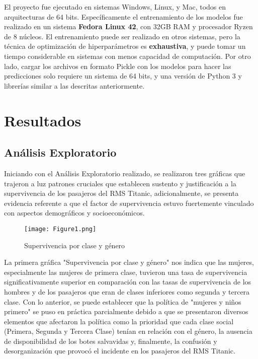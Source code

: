 \documentclass[conference]{IEEEtran}
\begin{document}
El proyecto fue ejecutado en sistemas Windows, Linux, y Mac, todos en arquitecturas de 64
bits. Específicamente el entrenamiento de los modelos fue realizado en un sistema \textbf{Fedora
Linux 42}, con 32GB RAM y procesador Ryzen de 8 núcleos. El entrenamiento puede ser
realizado en otros sistemas, pero la técnica de optimización de hiperparámetros es
\textbf{exhaustiva}, y puede tomar un tiempo considerable en sistemas con menos capacidad de
computación.  Por otro lado, cargar los archivos en formato Pickle con los modelos para
hacer las predicciones solo requiere un sistema de 64 bits, y una versión de Python 3 y
librerías similar a las descritas anteriormente.

\section{Resultados}
\subsection{Análisis Exploratorio}
Iniciando con el Análisis Exploratorio realizado, se realizaron tres gráficas que trajeron a luz patrones cruciales que establecen sustento y justificación a la supervivencia de los pasajeros del RMS Titanic, adicionalmente, se presenta evidencia referente a que el factor de supervivencia estuvo fuertemente vinculado con aspectos demográficos y socioeconómicos.


\begin{figure}[h!]
    \centering
    \texttt{[image: Figure1.png]}
    \caption{Supervivencia por clase y género}
    \label{fig:etiqueta_de_la_imagen}
\end{figure}

La primera gráfica "Supervivencia por clase y género" nos indica que las mujeres, especialmente las mujeres de primera clase, tuvieron una tasa de supervivencia significativamente superior en comparación con las tasas de supervivencia de los hombres y de los pasajeros que eran de clases inferiores como segunda y tercera clase. Con lo anterior, se puede establecer que la política de "mujeres y niños primero" se puso en práctica parcialmente debido a que se presentaron diversos elementos que afectaron la política como la prioridad que cada clase social (Primera, Segunda y Tercera Clase) tenían en relación con el género, la ausencia de disponibilidad de los botes salvavidas y, finalmente, la confusión y desorganización que provocó el incidente en los pasajeros del RMS Titanic.
\end{document}
